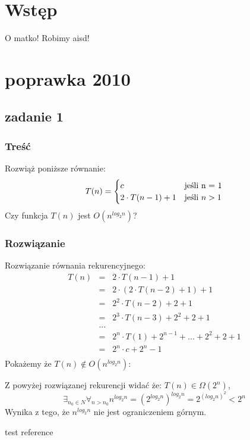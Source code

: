 \documentclass[svgnames]{report}
\begin{document}
\chapter{Wstęp}
O matko! Robimy aisd!
\chapter{poprawka 2010}
\section{zadanie 1}
\subsection{Treść}
Rozwiąż poniższe równanie:
\begin{equation*}
T(n) = 
	\begin{cases}
		c 					&	\hbox{jeśli n = 1}		\\
		2 \cdot T(n-1) + 1 	&	\hbox{jeśli $n > 1$}	\\
	\end{cases}
\end{equation*}
Czy funkcja $T(n)$ jest $O(n^{log_2 n})$?
\subsection{Rozwiązanie}
Rozwiązanie równania rekurencyjnego:
\begin{eqnarray*}
T(n) 	&=& 2 \cdot T(n-1) + 1	\\
		&=&	2 \cdot ( 2\cdot T(n-2) + 1 ) + 1	\\
		&=& 2^2 \cdot T(n-2) + 2 + 1	\\
		&=&	2^3 \cdot T(n-3) + 2^2 + 2 + 1 \\
		&...&	\\
		&=&	2^n\cdot T(1) + 2^{n-1} + ... + 2^2 + 2 + 1 \\
		&=& 2^n \cdot c + 2^n - 1	\\
\end{eqnarray*}
Pokażemy że $T(n) \not\in O(n^{log_2 n})$:

Z powyżej rozwiązanej rekurencji widać że: $T(n) \in \Omega (2^n)$, 
\begin{equation}
	\exists_{n_0 \in N} \forall_{n > n_0} n^{log_2 n} = \left(2^{log_2 n}\right)^{log_2 n} = 2^{(log_2 n)^2} < 2^n
\end{equation}
Wynika z tego, że $n^{log_2 n}$ nie jest ograniczeniem górnym.



\begin{thebibliography}{99}
 test reference
\end{thebibliography}
\end{document}
